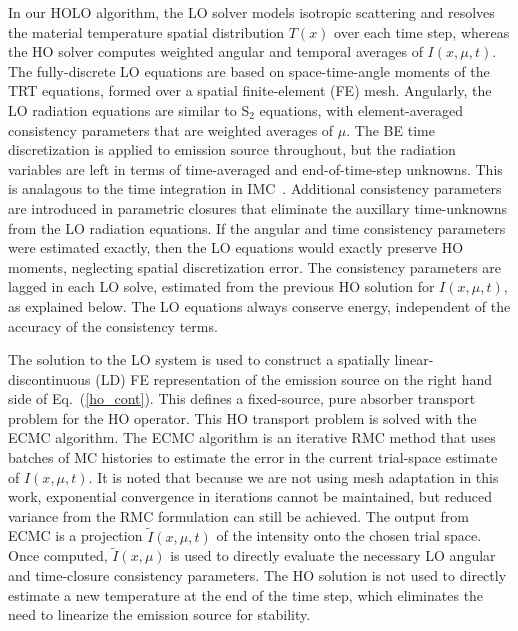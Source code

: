 \documentclass{anstrans}
\renewcommand{\eqref}[1]{(\ref{#1})}
\begin{document}
In our HOLO algorithm, the LO solver models isotropic scattering and
resolves the material temperature spatial distribution $T(x)$ over each time step, whereas
the HO solver computes weighted angular and temporal averages of $I(x,\mu,t)$.  The
fully-discrete LO equations are based on space-time-angle moments of the TRT equations, formed over a spatial finite-element (FE)
mesh.   Angularly, the LO
radiation equations are similar to S$_2$ equations,  with element-averaged
consistency parameters that are weighted averages of $\mu$. The BE time discretization is applied to emission source throughout, but the radiation
variables are left in terms of time-averaged and end-of-time-step unknowns.  This is analagous to
the time integration in IMC~\cite{wollaber_review}.   Additional
consistency parameters are introduced in parametric closures that eliminate the auxillary
time-unknowns from the LO radiation equations.
If the angular and time
consistency parameters were estimated exactly, then the LO equations would exactly preserve HO moments,
neglecting spatial discretization error.  The consistency parameters are lagged
in each LO solve, estimated from the previous HO solution for $I(x,\mu,t)$,
as explained below.    The LO equations always conserve energy,
independent of the accuracy of the consistency terms.

The solution to the LO system is used to construct a spatially linear-discontinuous (LD) FE representation of
the emission source on the right hand side of Eq.~\eqref{ho_cont}.  This defines a fixed-source, pure absorber
transport problem for the HO operator. This HO transport problem is solved with the ECMC algorithm.  The ECMC
algorithm is an iterative RMC method that uses
batches of MC histories to estimate the error in the current trial-space estimate of 
$I(x,\mu,t)$.  It is noted that because we are not using
mesh adaptation in this work, exponential convergence in iterations cannot be maintained,
but reduced variance from the RMC formulation can still be achieved.  The output from ECMC is a projection $\tilde I(x,\mu,t)$ of the intensity onto
the chosen trial space. Once computed, $\tilde{I}(x,\mu)$ is used to directly evaluate the
necessary LO angular and time-closure consistency parameters.   The HO solution is not used to directly estimate a new temperature at
the end of the time step, which eliminates the need to linearize the emission source for
stability.
\end{document}
